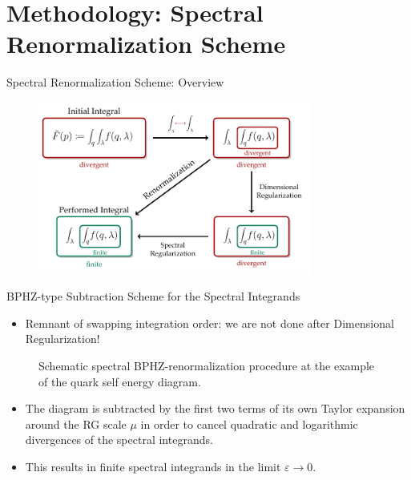 \section{Methodology: Spectral Renormalization Scheme}

\begin{frame}{Spectral Renormalization Scheme: Overview}
\addtocounter{framenumber}{-1}
 \begin{figure}[t]
\centering
\includegraphics[width=0.8\textwidth]{figs/tikz/spectral_renormalization}
\end{figure}
\end{frame}

\begin{frame}{BPHZ-type Subtraction Scheme for the Spectral Integrands}
\begin{itemize}
	\item Remnant of swapping integration order: we are not done after \alert{Dimensional Regularization}!
\end{itemize}
	 \begin{figure}[H]
	\centering
	
	\caption{Schematic spectral BPHZ-renormalization procedure at the example of the quark self energy diagram.} 
	\label{fig:BPHZ}
\end{figure}
\begin{itemize}
	\item  The diagram is subtracted by the first two terms of its own Taylor expansion around the RG scale $\mu$ in order to cancel quadratic and logarithmic divergences of the spectral integrands.\\[2em]
	\item This results in finite spectral integrands in the limit $\varepsilon\rightarrow 0$.
\end{itemize}
\end{frame}

